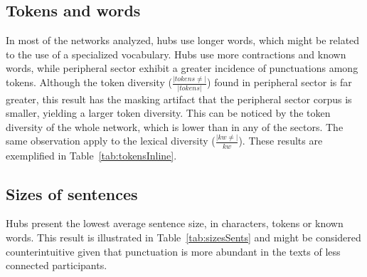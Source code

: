 \subsection{Tokens and words}\label{subsec:tw}
%


In most of the networks analyzed, hubs use longer words, which might be related to the use of a specialized vocabulary.
Hubs use more contractions and known words, while peripheral sector exhibit a greater incidence of punctuations among tokens.
Although the token diversity ($\frac{|tokens \neq|}{|tokens|}$) found in peripheral sector is far greater,
this result has the masking artifact that the peripheral sector corpus is smaller, yielding a larger token diversity.
This can be noticed by the token diversity of the whole network, which is lower than in any of the sectors.
The same observation apply to the lexical diversity ($\frac{|kw\neq|}{kw}$).
These results are exemplified in Table~\ref{tab:tokensInline}.



%

\subsection{Sizes of sentences}\label{subsec:ss}

Hubs present the lowest average sentence size,
in characters, tokens or known words.
This result is illustrated in Table~\ref{tab:sizesSents}
and might be considered counterintuitive given that punctuation
is more abundant in the texts of less connected participants.

